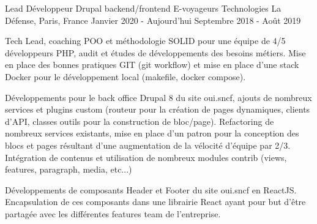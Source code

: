 \cventry
{Lead Développeur Drupal backend/frontend} %
{E-voyageurs Technologies} %
{La Défense, Paris, France} %
{Janvier 2020 - Aujourd'hui \newline Septembre 2018 - Août 2019} %
{
\begin{cvitems} %
    \item
    {
        Tech Lead, coaching POO et méthodologie SOLID pour une équipe de 4/5 développeurs PHP, audit et études
        de développements des besoins métiers. Mise en place des bonnes pratiques GIT (git workflow) et mise en place
        d'une stack Docker pour le développement local (makefile, docker compose).
    }
    \item
    {
        Développements pour le back office Drupal 8 du site oui.sncf, ajouts de nombreux services et plugins custom
        (routeur pour la création de pages dynamiques, clients d’API, classes outils pour la construction de bloc/page).
        Refactoring de nombreux services existants, mise en place d’un patron pour la conception des blocs et pages
        résultant d'une augmentation de la vélocité d’équipe par 2/3. Intégration de contenus et utilisation de nombreux
        modules contrib (views, features, paragraph, media, etc...)
    }
    \item
    {
        Développements de composants Header et Footer du site oui.sncf en ReactJS. Encapsulation de ces composants dans
        une librairie React ayant pour but d’être partagée avec les différentes features team de l’entreprise.
    }
\end{cvitems}
}

